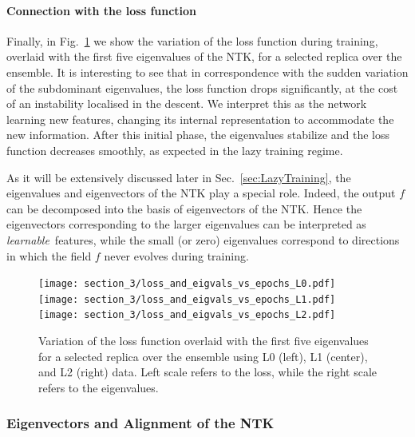 \FloatBarrier

\paragraph{Connection with the loss function} Finally, in Fig.~\ref{fig:Loss} we
show the variation of the loss function during training, overlaid with the first
five eigenvalues of the NTK, for a selected replica over the ensemble. It is
interesting to see that in correspondence with the sudden variation of the
subdominant eigenvalues, the loss function drops significantly, at the cost of
an instability localised in the descent. We interpret this as the network
learning new features, changing its internal representation to accommodate the
new information. After this initial phase, the eigenvalues stabilize and the
loss function decreases smoothly, as expected in the lazy training regime.

As it will be extensively discussed later in Sec.~\ref{sec:LazyTraining}, the
eigenvalues and eigenvectors of the NTK play a special role. Indeed, the output
$f$ can be decomposed into the basis of eigenvectors of the NTK. Hence the
eigenvectors corresponding to the larger eigenvalues can be interpreted as {\em
learnable}\ features, while the small (or zero) eigenvalues correspond to
directions in which the field $f$ never evolves during training.

\begin{figure}[ht]
  \centering
  \texttt{[image: section\_3/loss\_and\_eigvals\_vs\_epochs\_L0.pdf]}
  \texttt{[image: section\_3/loss\_and\_eigvals\_vs\_epochs\_L1.pdf]}
  \texttt{[image: section\_3/loss\_and\_eigvals\_vs\_epochs\_L2.pdf]}
  \caption{Variation of the loss function overlaid with the first five
  eigenvalues for a selected replica over the ensemble using L0 (left), L1
  (center), and L2 (right) data. Left scale refers to the loss, while the right
  scale refers to the eigenvalues.}
  \label{fig:Loss}
\end{figure}

\FloatBarrier

\subsubsection{Eigenvectors and Alignment of the NTK}
\label{sec:NTKAlign}

